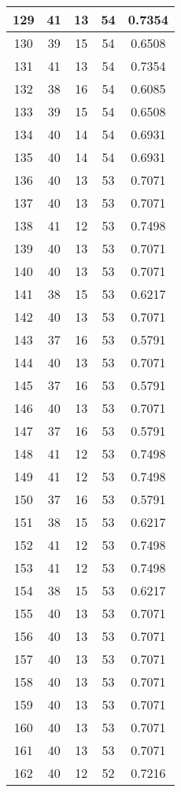 \documentclass[letterpaper, 12pt]{article}
\begin{document}
\begin{longtable}{|c|c|c|c|c|}
\hline
129 & 41 & 13 & 54 & 0.7354 \\
\hline
130 & 39 & 15 & 54 & 0.6508 \\
\hline
131 & 41 & 13 & 54 & 0.7354 \\
\hline
132 & 38 & 16 & 54 & 0.6085 \\
\hline
133 & 39 & 15 & 54 & 0.6508 \\
\hline
134 & 40 & 14 & 54 & 0.6931 \\
\hline
135 & 40 & 14 & 54 & 0.6931 \\
\hline
136 & 40 & 13 & 53 & 0.7071 \\
\hline
137 & 40 & 13 & 53 & 0.7071 \\
\hline
138 & 41 & 12 & 53 & 0.7498 \\
\hline
139 & 40 & 13 & 53 & 0.7071 \\
\hline
140 & 40 & 13 & 53 & 0.7071 \\
\hline
141 & 38 & 15 & 53 & 0.6217 \\
\hline
142 & 40 & 13 & 53 & 0.7071 \\
\hline
143 & 37 & 16 & 53 & 0.5791 \\
\hline
144 & 40 & 13 & 53 & 0.7071 \\
\hline
145 & 37 & 16 & 53 & 0.5791 \\
\hline
146 & 40 & 13 & 53 & 0.7071 \\
\hline
147 & 37 & 16 & 53 & 0.5791 \\
\hline
148 & 41 & 12 & 53 & 0.7498 \\
\hline
149 & 41 & 12 & 53 & 0.7498 \\
\hline
150 & 37 & 16 & 53 & 0.5791 \\
\hline
151 & 38 & 15 & 53 & 0.6217 \\
\hline
152 & 41 & 12 & 53 & 0.7498 \\
\hline
153 & 41 & 12 & 53 & 0.7498 \\
\hline
154 & 38 & 15 & 53 & 0.6217 \\
\hline
155 & 40 & 13 & 53 & 0.7071 \\
\hline
156 & 40 & 13 & 53 & 0.7071 \\
\hline
157 & 40 & 13 & 53 & 0.7071 \\
\hline
158 & 40 & 13 & 53 & 0.7071 \\
\hline
159 & 40 & 13 & 53 & 0.7071 \\
\hline
160 & 40 & 13 & 53 & 0.7071 \\
\hline
161 & 40 & 13 & 53 & 0.7071 \\
\hline
162 & 40 & 12 & 52 & 0.7216 \\

\end{longtable}
\end{document}

